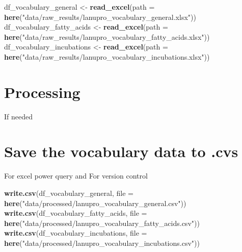 \documentclass[
]{article}
\newenvironment{Shaded}{\begin{snugshade}}{\end{snugshade}}
\newcommand{\AttributeTok}[1]{\textcolor[rgb]{0.13,0.29,0.53}{#1}}
\newcommand{\FunctionTok}[1]{\textcolor[rgb]{0.13,0.29,0.53}{\textbf{#1}}}
\newcommand{\NormalTok}[1]{#1}
\newcommand{\OtherTok}[1]{\textcolor[rgb]{0.56,0.35,0.01}{#1}}
\newcommand{\StringTok}[1]{\textcolor[rgb]{0.31,0.60,0.02}{#1}}
\begin{document}
\begin{Shaded}
\begin{Highlighting}[]
\NormalTok{df\_vocabulary\_general }\OtherTok{\textless{}{-}} \FunctionTok{read\_excel}\NormalTok{(}\AttributeTok{path =} \FunctionTok{here}\NormalTok{(}\StringTok{"data/raw\_results/lanupro\_vocabulary\_general.xlsx"}\NormalTok{))}
\NormalTok{df\_vocabulary\_fatty\_acids }\OtherTok{\textless{}{-}} \FunctionTok{read\_excel}\NormalTok{(}\AttributeTok{path =} \FunctionTok{here}\NormalTok{(}\StringTok{"data/raw\_results/lanupro\_vocabulary\_fatty\_acids.xlsx"}\NormalTok{))}
\NormalTok{df\_vocabulary\_incubations }\OtherTok{\textless{}{-}} \FunctionTok{read\_excel}\NormalTok{(}\AttributeTok{path =} \FunctionTok{here}\NormalTok{(}\StringTok{"data/raw\_results/lanupro\_vocabulary\_incubations.xlsx"}\NormalTok{))}
\end{Highlighting}
\end{Shaded}

\section{Processing}\label{processing}

If needed

\section{Save the vocabulary data to .cvs}\label{save-the-vocabulary-data-to-.cvs}

For excel power query and
For version control

\begin{Shaded}
\begin{Highlighting}[]
\FunctionTok{write.csv}\NormalTok{(df\_vocabulary\_general, }\AttributeTok{file =} \FunctionTok{here}\NormalTok{(}\StringTok{"data/processed/lanupro\_vocabulary\_general.csv"}\NormalTok{))}
\FunctionTok{write.csv}\NormalTok{(df\_vocabulary\_fatty\_acids, }\AttributeTok{file =} \FunctionTok{here}\NormalTok{(}\StringTok{"data/processed/lanupro\_vocabulary\_fatty\_acids.csv"}\NormalTok{))}
\FunctionTok{write.csv}\NormalTok{(df\_vocabulary\_incubations, }\AttributeTok{file =} \FunctionTok{here}\NormalTok{(}\StringTok{"data/processed/lanupro\_vocabulary\_incubations.csv"}\NormalTok{))}
\end{Highlighting}
\end{Shaded}
\end{document}
